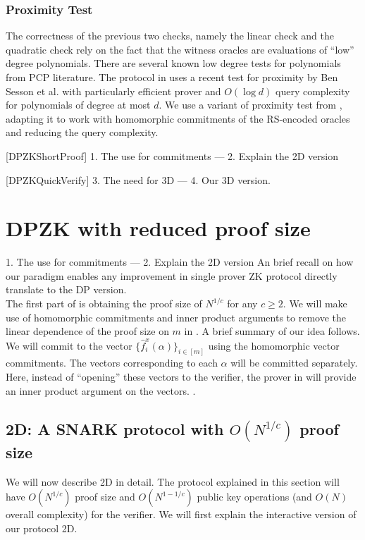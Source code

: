 \subsubsection{Proximity Test}
The correctness of the previous two checks, namely the linear check and the
quadratic check rely on the fact that the witness oracles are evaluations of
``low'' degree polynomials. There are several known low degree tests for polynomials
from PCP literature. The protocol in \cite{Aurora} uses a recent test for
proximity by Ben Sesson et al.\cite{IOPP_FRI2018} with particularly efficient
prover and $O(\log d)$ query complexity for polynomials of degree at most $d$. 
We use a variant of proximity test from \cite{Ligero2017}, adapting it to work
with homomorphic commitments of the RS-encoded oracles and reducing the query
complexity.


[DPZKShortProof]
1. The use for commitments --- 2. Explain the 2D version  

[DPZKQuickVerify]
3. The need for 3D --- 4. Our 3D version.


\section{DPZK with reduced proof size}
1. The use for commitments --- 2. Explain the 2D version  
An brief recall on how our paradigm enables any improvement in single prover ZK protocol directly translate to the DP version.\\

The first part of \name{} is obtaining the proof size of $N^{1/c}$ for any $c \geq 2$.
We will make use of homomorphic commitments and inner product arguments to remove the linear dependence of the proof size on $m$ in \cite{ligero}. A brief summary of our idea follows. We will commit to the vector $\{\hat{f}^x_i(\alpha)\}_{i \in [m]}$ using the homomorphic vector commitments. The vectors corresponding to each $\alpha$ will be committed separately. Here, instead of ``opening'' these vectors to the verifier, the prover in \name{} will provide an inner product argument on the vectors.
.

\subsection{\name2D{}: A SNARK protocol with $O(N^{1/c})$ proof size}

We will now describe \name2D{} in detail. The protocol explained in this section will have $O(N^{1/c})$ proof size and $O(N^{1-1/c})$ public key operations (and $O(N)$ overall complexity) for the verifier. We will first explain the interactive version of our protocol \name2D{}. \\

